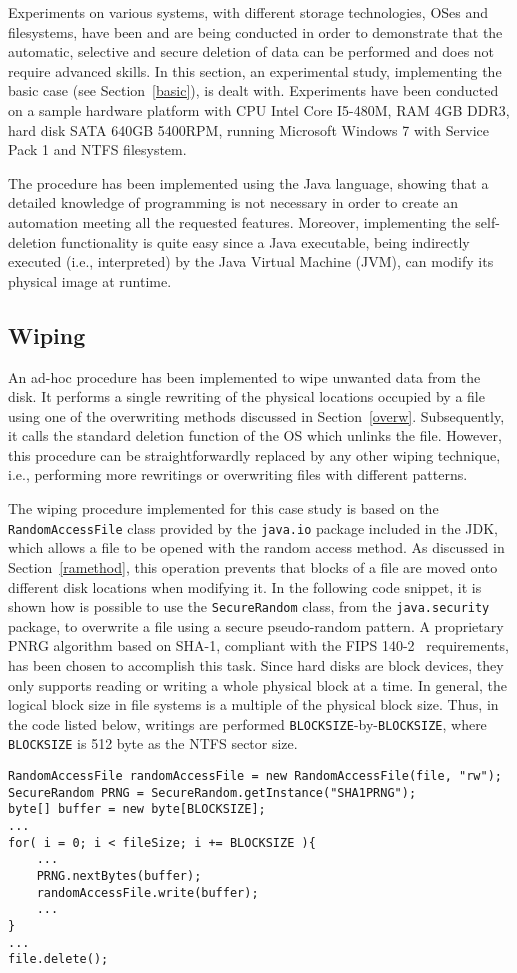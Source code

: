 \documentclass[10pt, conference, compsocconf]{IEEEtran}
\begin{document}
Experiments on various systems, with different storage technologies, OSes and filesystems, have been and are being conducted in order to demonstrate that the automatic, selective and secure deletion of data can be performed and does not require advanced skills.
In this section, an experimental study, implementing the basic case (see Section~\ref{basic}), is dealt with. Experiments have been conducted on
a sample hardware platform with CPU Intel Core I5-480M, RAM 4GB DDR3, hard disk SATA 640GB 5400RPM, running Microsoft Windows 7 with Service Pack 1 and NTFS filesystem.


The procedure has been implemented using the Java language, showing that a detailed knowledge of programming is not necessary in order to create an automation meeting all the requested features. Moreover, implementing the self-deletion functionality is quite easy since a Java executable, being indirectly executed (i.e., interpreted) by the Java Virtual Machine (JVM), can modify its physical image at runtime.

\subsection{Wiping}
\label{case_wiping}
An ad-hoc procedure has been implemented to wipe unwanted data from the disk. It performs a single rewriting of the physical locations occupied by a file using one of the overwriting methods discussed in Section~\ref{overw}. Subsequently, it calls the standard deletion function of the OS which unlinks the file. However, this procedure can be straightforwardly replaced by any other wiping technique, i.e., performing more rewritings or overwriting files with different patterns.

The wiping procedure implemented for this case study is based on the \verb=RandomAccessFile= class provided by the \verb=java.io= package included in the JDK, which allows a file to be opened with the random access method. As discussed in Section~\ref{ramethod}, this operation prevents that blocks of a file are moved onto different disk locations when modifying it.
In the following code snippet, it is shown how is possible to use the \verb=SecureRandom= class, from the \verb=java.security= package, to overwrite a file using a secure pseudo-random pattern. A proprietary PNRG algorithm based on SHA-1, compliant with the FIPS 140-2~\cite{secrand} requirements, has been chosen to accomplish this task.
Since hard disks are block devices, they only supports reading or writing a whole physical block at a time. In general, the logical block size in file systems is a multiple of the physical block size. Thus, in the code listed below, writings are performed \verb=BLOCKSIZE=-by-\verb=BLOCKSIZE=, where \verb=BLOCKSIZE= is 512 byte as the NTFS sector size.
\begin{lstlisting}
RandomAccessFile randomAccessFile = new RandomAccessFile(file, "rw");
SecureRandom PRNG = SecureRandom.getInstance("SHA1PRNG");
byte[] buffer = new byte[BLOCKSIZE];
...
for( i = 0; i < fileSize; i += BLOCKSIZE ){	
    ...
	PRNG.nextBytes(buffer);
	randomAccessFile.write(buffer);
    ... 
}
...
file.delete();
\end{lstlisting}
\end{document}
